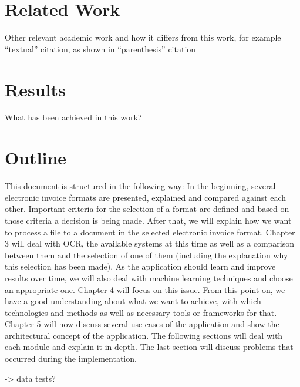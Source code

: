 \section{Related Work}

Other relevant academic work and how it differs from this work, for
example %
``textual'' citation, as shown in %
``parenthesis'' citation %



\section{Results}

What has been achieved in this work?


\section{Outline}

This document is structured in the following way: In the beginning, several electronic invoice formats are presented, explained and compared against each other. Important criteria for the selection of a format are defined and based on those criteria a decision is being made.
After that, we will explain how we want to process a file to a document in the selected electronic invoice format. Chapter 3 will deal with OCR, the available systems at this time as well as a comparison between them and the selection of one of them (including the explanation why this selection has been made).
As the application should learn and improve results over time, we will also deal with machine learning techniques and choose an appropriate one. Chapter 4 will focus on this issue.
From this point on, we have a good understanding about what we want to achieve, with which technologies and methods as well as necessary tools or frameworks for that. Chapter 5 will now discuss several use-cases of the application and show the architectural concept of the application. The following sections will deal with each module and explain it in-depth. The last section will discuss problems that occurred during the implementation.

-> data tests?

